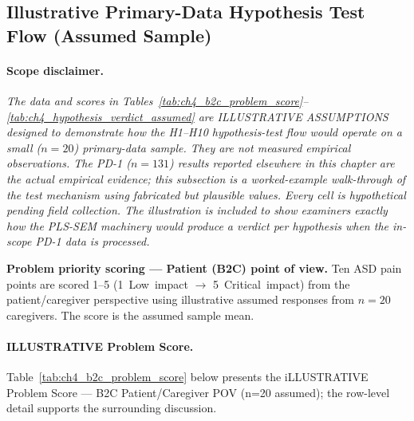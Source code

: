 \subsection{Illustrative Primary-Data Hypothesis Test Flow (Assumed Sample)}
\label{subsec:ch4_illustrative_hypothesis_flow}

\paragraph{Scope disclaimer.} \emph{The data and scores in Tables~\ref{tab:ch4_b2c_problem_score}--\ref{tab:ch4_hypothesis_verdict_assumed} are ILLUSTRATIVE ASSUMPTIONS designed to demonstrate how the H1--H10 hypothesis-test flow would operate on a small ($n{=}20$) primary-data sample. They are not measured empirical observations. The PD-1 ($n{=}131$) results reported elsewhere in this chapter are the actual empirical evidence; this subsection is a worked-example walk-through of the test mechanism using fabricated but plausible values. Every cell is hypothetical pending field collection. The illustration is included to show examiners exactly how the PLS-SEM machinery would produce a verdict per hypothesis when the in-scope PD-1 data is processed.}

\noindent\textbf{Problem priority scoring --- Patient (B2C) point of view.} Ten ASD pain points are scored 1--5 (1~Low~impact $\to$ 5~Critical~impact) from the patient/caregiver perspective using illustrative assumed responses from $n{=}20$ caregivers. The score is the assumed sample mean.

\noindent{}\vspace{4pt}

\paragraph{ILLUSTRATIVE Problem Score.}
\noindent Table~\ref{tab:ch4_b2c_problem_score} below presents the iLLUSTRATIVE Problem Score --- B2C Patient/Caregiver POV (n=20 assumed); the row-level detail supports the surrounding discussion.




